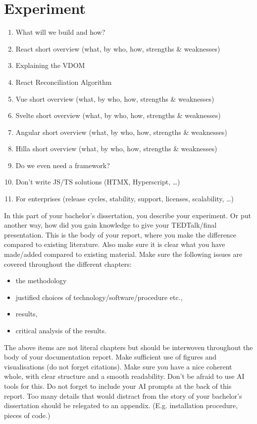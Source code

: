 \chapter{Experiment}

\begin{enumerate}
    \item What will we build and how?
    \item React short overview (what, by who, how, strengths \& weaknesses)
    \item Explaining the VDOM
    \item React Reconciliation Algorithm
    \item Vue short overview (what, by who, how, strengths \& weaknesses)
    \item Svelte short overview (what, by who, how, strengths \& weaknesses)
    \item Angular short overview (what, by who, how, strengths \& weaknesses)
    \item Hilla short overview (what, by who, how, strengths \& weaknesses)
    \item Do we even need a framework?
    \item Don’t write JS/TS solutions (HTMX, Hyperscript, …) 
    \item For enterprises (release cycles, stability, support, licenses, scalability, …) 
\end{enumerate}

In this part of your bachelor's dissertation, you describe your experiment. Or put another way, how did you gain knowledge to give your TEDTalk/final presentation. 
This is the body of your report, where you make the difference compared to existing literature. Also make sure it is clear what you have made/added compared to existing material.
Make sure the following issues are covered throughout the different chapters:
\begin{itemize}
    \item the methodology
    \item justified choices of technology/software/procedure etc., 
    \item results, 
    \item critical analysis of the results. 
\end{itemize}
The above items are not literal chapters but should be interwoven throughout the body of your documentation report.
Make sufficient use of figures and visualisations (do not forget citations). Make sure you have a nice coherent whole, with clear structure and a smooth readability. Don't be afraid to use AI tools for this. Do not forget to include your AI prompts at the back of this report.
Too many details that would distract from the story of your bachelor's dissertation should be relegated to an appendix. (E.g. installation procedure, pieces of code.) 
